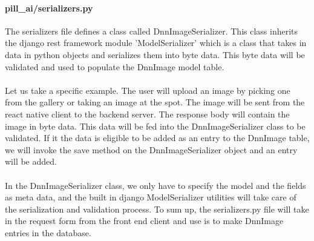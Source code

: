 \documentclass[conference]{IEEEtran}
\begin{document}
\paragraph{pill\_ai/serializers.py}
The serializers file defines a class called DnnImageSerializer. This class inherits the django rest framework module 'ModelSerializer' which is a class that takes in data in python objects and serializes them into byte data. This byte data will be validated and used to populate the DnnImage model table. \\ \\
Let us take a specific example. The user will upload an image by picking one from the gallery or taking an image at the spot. The image will be sent from the react native client to the backend server. The response body will contain the image in byte data. This data will be fed into the DnnImageSerializer class to be validated. If it the data is eligible to be added as an entry to the DnnImage table, we will invoke the save method on the DnnImageSerializer object and an entry will be added. \\ \\
In the DnnImageSerializer class, we only have to specify the model and the fields as meta data, and the built in django ModelSerializer utilities will take care of the serialization and validation process. To sum up, the serializers.py file will take in the request form from the front end client and use is to make DnnImage entries in the database.\\
\end{document}
